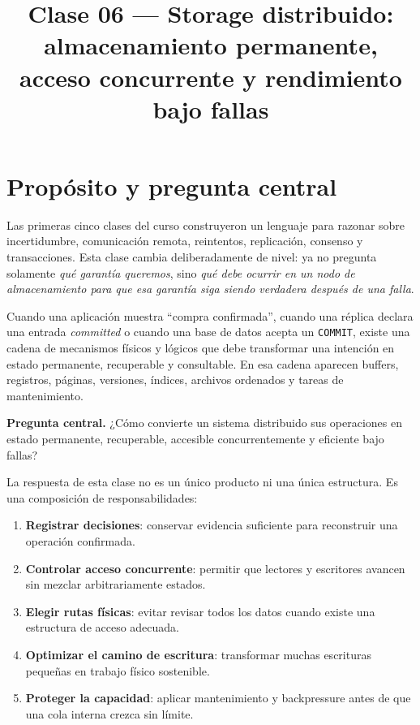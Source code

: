 \documentclass[variant=apuntes,cover=institutional,mode=screen]{ua-engineering-v6-article}
\title{Clase 06 --- Storage distribuido: almacenamiento permanente, acceso concurrente y rendimiento bajo fallas}
\author{\UAProfessor}
\date{\UADate}
\begin{document}
\setlength{\emergencystretch}{2em}
\maketitle
\tableofcontents
\clearpage

\section{Propósito y pregunta central}

Las primeras cinco clases del curso construyeron un lenguaje para razonar sobre incertidumbre, comunicación remota, reintentos, replicación, consenso y transacciones. Esta clase cambia deliberadamente de nivel: ya no pregunta solamente \emph{qué garantía queremos}, sino \emph{qué debe ocurrir en un nodo de almacenamiento para que esa garantía siga siendo verdadera después de una falla}.

Cuando una aplicación muestra ``compra confirmada'', cuando una réplica declara una entrada \emph{committed} o cuando una base de datos acepta un \texttt{COMMIT}, existe una cadena de mecanismos físicos y lógicos que debe transformar una intención en estado permanente, recuperable y consultable. En esa cadena aparecen buffers, registros, páginas, versiones, índices, archivos ordenados y tareas de mantenimiento.

\begin{uakeybox}
\textbf{Pregunta central.} ¿Cómo convierte un sistema distribuido sus operaciones en estado permanente, recuperable, accesible concurrentemente y eficiente bajo fallas?
\end{uakeybox}

La respuesta de esta clase no es un único producto ni una única estructura. Es una composición de responsabilidades:

\begin{enumerate}
\item \textbf{Registrar decisiones}: conservar evidencia suficiente para reconstruir una operación confirmada.
\item \textbf{Controlar acceso concurrente}: permitir que lectores y escritores avancen sin mezclar arbitrariamente estados.
\item \textbf{Elegir rutas físicas}: evitar revisar todos los datos cuando existe una estructura de acceso adecuada.
\item \textbf{Optimizar el camino de escritura}: transformar muchas escrituras pequeñas en trabajo físico sostenible.
\item \textbf{Proteger la capacidad}: aplicar mantenimiento y backpressure antes de que una cola interna crezca sin límite.
\end{enumerate}
\end{document}
